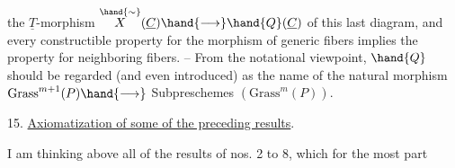 the $\underline{T}$-morphism $\overset{\hand{\sim}}{X}(\underline{C}) \hand{\longrightarrow} \hand{Q}(\underline{C})$ of this last diagram, and every constructible
property for  the morphism of generic fibers implies
the property for neighboring fibers. -- From the notational viewpoint,
$\hand{Q}$ should be regarded (and even introduced) as the name of the natural morphism 
$\mathrm{Grass}^{m+1}(P) \hand{\longrightarrow}$  Subpreschemes $(\mathrm{Grass}^{m}(P))$.

15. \uline{Axiomatization of some of the preceding results}.

I am thinking above all of the results of nos. 2 to 8, which for the most part

